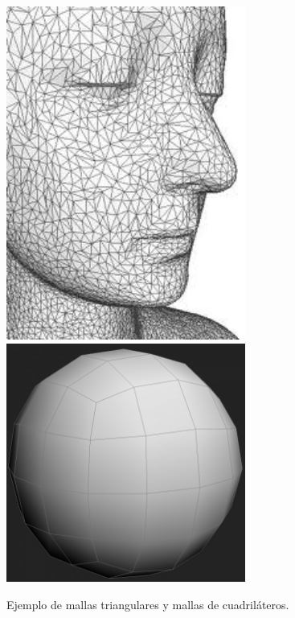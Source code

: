 \begin{figure}[H]
  \centering
    \includegraphics[width=0.7\textwidth]{./Cap2_videomapping/EjemploMallaTriangular}
    \includegraphics[width=0.7\textwidth]{./Cap2_videomapping/EjemploMalla4Vertices}
  \caption{Ejemplo de mallas triangulares y mallas de cuadriláteros.}
  \label{fig:mallas}
\end{figure}


